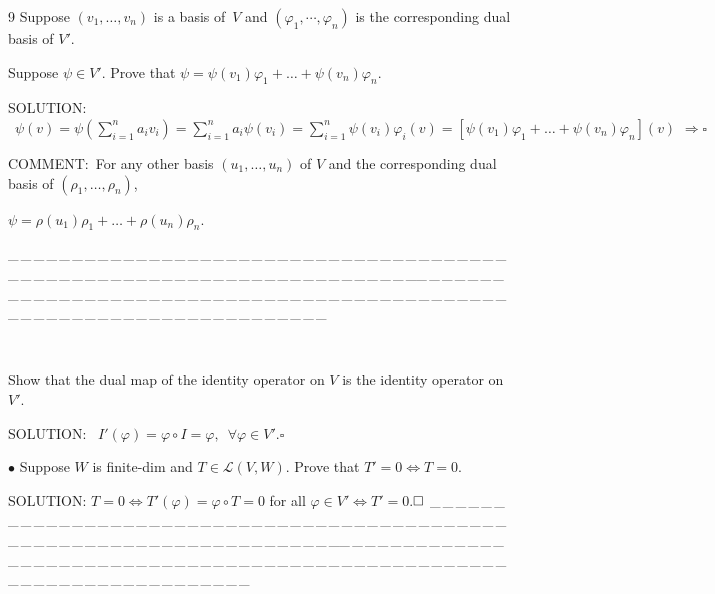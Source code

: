\documentclass[a4paper, 11pt, UTF8]{article}
\def\Lm{\mathcal{L}}
\begin{document}
\begin{large}
{\timesbf\Large 9} {\timessl\Large
Suppose $(v_{1},\dots,v_{n})$ is a basis of \,$V$ and $(\varphi_{1},\cdots,\varphi_{n})$ is the corresponding dual basis of $V'$.}\par\quad
{\timessl \Large
Suppose $\psi \in V'$. Prove that $\psi=\psi(v_1)\varphi_1+\dots+\psi(v_n)\varphi_n.$
}\par
{\timesbf S\footnotesize{OLUTION:}} $\,\,\,\psi(v)=\psi(\sum\limits_{i=1}^n a_i v_i)=\sum\limits_{i=1}^n a_i\psi(v_i)=\sum\limits_{i=1}^n\psi(v_{i})\varphi_i(v)=[\psi(v_1)\varphi_1+\dots+\psi(v_n)\varphi_n](v) \,\,\Rightarrow \square$\par
C{\small OMMENT}:\,\,\,For any other basis $(u_1,\dots,u_n)$ of $V$ and the corresponding dual basis of $(\rho_1,\dots,\rho_n)$,\par\qquad\qquad\quad
$\psi=\rho(u_1)\rho_1+\dots+\rho(u_n)\rho_n.$\par
{\tiny \_\,\_\,\_\,\_\,\_\,\_\,\_\,\_\,\_\,\_\,\_\,\_\,\_\,\_\,\_\,\_\,\_\,\_\,\_\,\_\,\_\,\_\,\_\,\_\,\_\,\_\,\_\,\_\,\_\,\_\,\_\,\_\,\_\,\_\,\_\,\_\,\_\,\_\,\_\,\_\,\_\,\_\,\_\,\_\,\_\,\_\,\_\,\_\,\_\,\_\,\_\,\_\,\_\,\_\,\_\,\_\,\_\,\_\,\_\,\_\,\_\,\_\,\_\,\_\,\_\,\_\,\_\,\_\,\_\,\_\,\_\_\,\_\,\_\,\_\,\_\,\_\,\_\,\_\,\_\,\_\,\_\,\_\,\_\,\_\,\_\,\_\,\_\,\_\,\_\,\_\,\_\,\_\,\_\,\_\,\_\,\_\,\_\,\_\,\_\,\_\,\_\,\_\,\_\,\_\,\_\,\_\,\_\,\_\,\_\,\_\,\_\,\_\,\_\,\_\,\_\,\_\,\_\,\_\,\_\,\_\,\_\,\_\,\_\,\_\,\_\,\_\,\_\,\_\,\_\,\_\,\_\,\_\,\_\,\_\,\_\,\_\,\_\,\_\,\_\,\_\,\_}{\tiny\,\par}

{\Large{}} {\timessl\Large Show that the dual map of the identity operator on $V$ is the identity operator on $V'$.
}\par
{\timesbf S\footnotesize{OLUTION:}} \,\,\,$I'(\varphi)=\varphi\circ I=\varphi,\,\,\,\forall \varphi \in V'.$\qquad$\square$\par
{\small $\bullet$} {\timessl\Large
Suppose $W$ is finite-dim and $T \in \Lm(V, W)$. Prove that $T'=0 \Longleftrightarrow T=0.$
}\par
{\timesbf S\footnotesize{OLUTION:}} $T=0\Leftrightarrow T'(\varphi)=\varphi\circ T=0$ for all $\varphi\in V'\Leftrightarrow T'=0$.\quad$\square \\ $
{\tiny \_\,\_\,\_\,\_\,\_\,\_\,\_\,\_\,\_\,\_\,\_\,\_\,\_\,\_\,\_\,\_\,\_\,\_\,\_\,\_\,\_\,\_\,\_\,\_\,\_\,\_\,\_\,\_\,\_\,\_\,\_\,\_\,\_\,\_\,\_\,\_\,\_\,\_\,\_\,\_\,\_\,\_\,\_\,\_\,\_\,\_\,\_\,\_\,\_\,\_\,\_\,\_\,\_\,\_\,\_\,\_\,\_\,\_\,\_\,\_\,\_\,\_\,\_\,\_\,\_\,\_\,\_\,\_\,\_\,\_\,\_\_\,\_\,\_\,\_\,\_\,\_\,\_\,\_\,\_\,\_\,\_\,\_\,\_\,\_\,\_\,\_\,\_\,\_\,\_\,\_\,\_\,\_\,\_\,\_\,\_\,\_\,\_\,\_\,\_\,\_\,\_\,\_\,\_\,\_\,\_\,\_\,\_\,\_\,\_\,\_\,\_\,\_\,\_\,\_\,\_\,\_\,\_\,\_\,\_\,\_\,\_\,\_\,\_\,\_\,\_\,\_\,\_\,\_\,\_\,\_\,\_\,\_\,\_\,\_\,\_\,\_\,\_\,\_\,\_\,\_\,\_}\par


\end{large}
\end{document}
